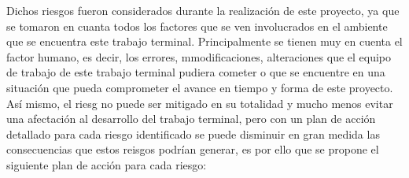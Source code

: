 Dichos riesgos fueron considerados durante la realización de este proyecto, ya que se tomaron en cuanta todos los factores que se ven involucrados en el ambiente que se encuentra este trabajo terminal. Principalmente se tienen muy en cuenta el factor humano, es decir, los errores, mmodificaciones, alteraciones que el equipo de trabajo de este trabajo terminal pudiera cometer o que se encuentre en una situación que pueda comprometer el avance en tiempo y forma de este proyecto.\\ 

Así mismo, el riesg no puede ser mitigado en su totalidad y mucho menos evitar una afectación al desarrollo del trabajo terminal, pero con un plan de acción detallado para cada riesgo identificado se puede disminuir en gran medida las consecuencias que estos reisgos podrían generar, es por ello que se propone el siguiente plan de acción para cada riesgo: 


